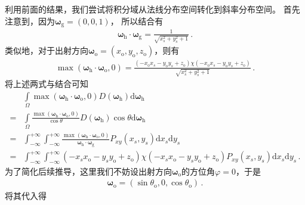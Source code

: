 利用前面的结果，我们尝试将积分域从法线分布空间转化到斜率分布空间。
首先注意到，因为${\bm\omega}_{\mathrm{g}}=(0,0,1)$，
所以结合有
\begin{align}
    {\bm\omega}_{\mathrm{h}}\cdot{\bm\omega}_{\mathrm{g}}
    =\frac{1}{\sqrt{x_s^2+y_s^2+1}}\, .
\end{align}
类似地，对于出射方向${\bm\omega}_{\mathrm{o}}=(x_{\mathrm{o}},y_{\mathrm{o}},z_{\mathrm{o}})$，则有
\begin{align}
    \max({\bm\omega}_{\mathrm{h}}\cdot{\bm\omega}_{\mathrm{o}},0)
    =\frac{(-x_{\mathrm{o}}x_s-y_{\mathrm{o}}y_s+z_{\mathrm{o}})
    \chi(-x_{\mathrm{o}}x_s-y_{\mathrm{o}}y_s+z_{\mathrm{o}})}{\sqrt{x_s^2+y_s^2+1}}\, .
\end{align}
将上述两式与结合可知
\begin{align}\label{eq:08-ex01-trans-normal-slope}
      & \int\limits_{\varOmega}\max({\bm\omega}_{\mathrm{h}}\cdot{\bm\omega}_{\mathrm{o}},0)
    D({\bm\omega}_{\mathrm{h}})\mathrm{d}{\bm\omega}_{\mathrm{h}}\nonumber                          \\
    = & \int\limits_{\varOmega}\frac{\max({\bm\omega}_{\mathrm{h}}\cdot{\bm\omega}_{\mathrm{o}},0)}
    {\cos\theta}D({\bm\omega}_{\mathrm{h}})\cos\theta\mathrm{d}{\bm\omega}_{\mathrm{h}}\nonumber    \\
    = & \int_{-\infty}^{+\infty}\int_{-\infty}^{+\infty}
    \frac{\max({\bm\omega}_{\mathrm{h}}\cdot{\bm\omega}_{\mathrm{o}},0)}
    {{\bm\omega}_{\mathrm{h}}\cdot{\bm\omega}_{\mathrm{g}}}
    P_{xy}(x_s,y_s)\mathrm{d}x_s\mathrm{d}y_s\nonumber                                              \\
    = & \int_{-\infty}^{+\infty}\int_{-\infty}^{+\infty}
    (-x_sx_{\mathrm{o}}-y_sy_{\mathrm{o}}+z_{\mathrm{o}})
    \chi(-x_sx_{\mathrm{o}}-y_sy_{\mathrm{o}}+z_{\mathrm{o}})
    P_{xy}(x_s,y_s)\mathrm{d}x_s\mathrm{d}y_s\, .
\end{align}
为了简化后续推导，这里我们不妨设出射方向${\bm\omega}_{\mathrm{o}}$的方位角$\varphi=0$，于是
\begin{align}
    {\bm\omega}_{\mathrm{o}}=(\sin\theta_{\mathrm{o}},0,\cos\theta_{\mathrm{o}})\, .
\end{align}
将其代入得
